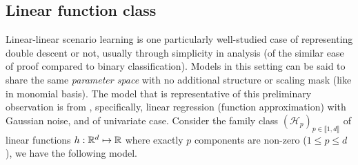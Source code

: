 \documentclass[10pt]{article} %
\begin{document}
\subsection{Linear function class}

Linear-linear scenario learning is one particularly well-studied case of representing double descent or not, usually through simplicity in analysis (of the similar ease of proof compared to binary classification). Models in this setting can be said to share the same \textit{parameter space} with no additional structure or scaling mask (like in monomial basis). The model that is representative of this preliminary observation is from \cite{lafon_understanding_2024}, specifically, linear regression (function approximation) with Gaussian noise, and of univariate case. Consider the family class $(\mathcal{H}_p)_{p\in\llbracket1,d\rrbracket}$ of linear functions $h:\mathbb{R}^d\mapsto \mathbb{R}$ where exactly $p$ components are non-zero ($1\leq p\leq d$), we have the following model.
\end{document}
